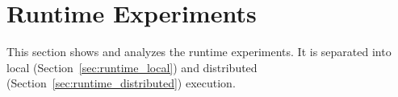 \newpage
\section{Runtime Experiments}
\label{sec:runtime}

This section shows and analyzes the runtime experiments.
It is separated into local (Section~\ref{sec:runtime_local}) and distributed (Section~\ref{sec:runtime_distributed}) execution.





